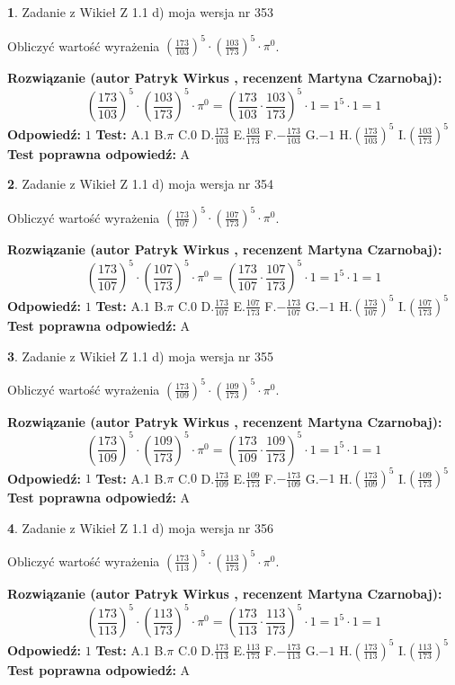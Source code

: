\documentclass[12pt, a4paper]{article}
\theoremstyle{definition} %
\newtheorem{zad}{}
\newcommand{\zadStart}[1]{\begin{zad}#1\newline}
\newcommand{\zadStop}{\end{zad}}
\newcommand{\rozwStart}[2]{\noindent \textbf{Rozwiązanie (autor #1 , recenzent #2): }\newline}
\newcommand{\rozwStop}{\newline}
\newcommand{\odpStart}{\noindent \textbf{Odpowiedź:}\newline}
\newcommand{\odpStop}{\newline}
\newcommand{\testStart}{\noindent \textbf{Test:}\newline}
\newcommand{\testStop}{\newline}
\newcommand{\kluczStart}{\noindent \textbf{Test poprawna odpowiedź:}\newline}
\newcommand{\kluczStop}{\newline}
\begin{document}
\zadStart{Zadanie z Wikieł Z 1.1 d) moja wersja nr 353}

Obliczyć wartość wyrażenia $(\frac{173}{103})^{5} \cdot (\frac{103}{173})^{5} \cdot \pi^{0}$.
\zadStop
\rozwStart{Patryk Wirkus}{Martyna Czarnobaj}
$$(\frac{173}{103})^{5} \cdot (\frac{103}{173})^{5} \cdot \pi^{0} = (\frac{173}{103} \cdot \frac{103}{173})^{5} \cdot 1 = 1^{5} \cdot 1 = 1$$
\rozwStop
\odpStart
$1$
\odpStop
\testStart
A.$1$ B.$\pi$ C.$0$ D.$\frac{173}{103}$ E.$\frac{103}{173}$
F.$-\frac{173}{103}$ G.$-1$
H.$(\frac{173}{103})^{5}$
I.$(\frac{103}{173})^{5}$
\testStop
\kluczStart
A
\kluczStop



\zadStart{Zadanie z Wikieł Z 1.1 d) moja wersja nr 354}

Obliczyć wartość wyrażenia $(\frac{173}{107})^{5} \cdot (\frac{107}{173})^{5} \cdot \pi^{0}$.
\zadStop
\rozwStart{Patryk Wirkus}{Martyna Czarnobaj}
$$(\frac{173}{107})^{5} \cdot (\frac{107}{173})^{5} \cdot \pi^{0} = (\frac{173}{107} \cdot \frac{107}{173})^{5} \cdot 1 = 1^{5} \cdot 1 = 1$$
\rozwStop
\odpStart
$1$
\odpStop
\testStart
A.$1$ B.$\pi$ C.$0$ D.$\frac{173}{107}$ E.$\frac{107}{173}$
F.$-\frac{173}{107}$ G.$-1$
H.$(\frac{173}{107})^{5}$
I.$(\frac{107}{173})^{5}$
\testStop
\kluczStart
A
\kluczStop



\zadStart{Zadanie z Wikieł Z 1.1 d) moja wersja nr 355}

Obliczyć wartość wyrażenia $(\frac{173}{109})^{5} \cdot (\frac{109}{173})^{5} \cdot \pi^{0}$.
\zadStop
\rozwStart{Patryk Wirkus}{Martyna Czarnobaj}
$$(\frac{173}{109})^{5} \cdot (\frac{109}{173})^{5} \cdot \pi^{0} = (\frac{173}{109} \cdot \frac{109}{173})^{5} \cdot 1 = 1^{5} \cdot 1 = 1$$
\rozwStop
\odpStart
$1$
\odpStop
\testStart
A.$1$ B.$\pi$ C.$0$ D.$\frac{173}{109}$ E.$\frac{109}{173}$
F.$-\frac{173}{109}$ G.$-1$
H.$(\frac{173}{109})^{5}$
I.$(\frac{109}{173})^{5}$
\testStop
\kluczStart
A
\kluczStop



\zadStart{Zadanie z Wikieł Z 1.1 d) moja wersja nr 356}

Obliczyć wartość wyrażenia $(\frac{173}{113})^{5} \cdot (\frac{113}{173})^{5} \cdot \pi^{0}$.
\zadStop
\rozwStart{Patryk Wirkus}{Martyna Czarnobaj}
$$(\frac{173}{113})^{5} \cdot (\frac{113}{173})^{5} \cdot \pi^{0} = (\frac{173}{113} \cdot \frac{113}{173})^{5} \cdot 1 = 1^{5} \cdot 1 = 1$$
\rozwStop
\odpStart
$1$
\odpStop
\testStart
A.$1$ B.$\pi$ C.$0$ D.$\frac{173}{113}$ E.$\frac{113}{173}$
F.$-\frac{173}{113}$ G.$-1$
H.$(\frac{173}{113})^{5}$
I.$(\frac{113}{173})^{5}$
\testStop
\kluczStart
A
\kluczStop
\end{document}
